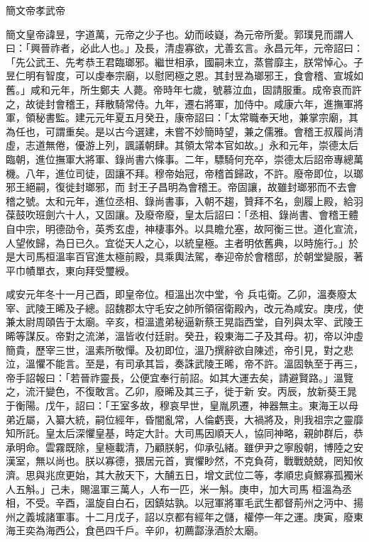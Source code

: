 
\begin{pinyinscope}

 簡文帝孝武帝



 簡文皇帝諱昱，字道萬，元帝之少子也。幼而岐嶷，為元帝所愛。郭璞見而謂人曰：「興晉祚者，必此人也。」及長，清虛寡欲，尤善玄言。永昌元年，元帝詔曰：「先公武王、先考恭王君臨瑯邪。繼世相承，國嗣未立，蒸嘗靡主，朕常悼心。子昱仁明有智度，可以虔奉宗廟，以慰罔極之恩。其封昱為瑯邪王，食會稽、宣城如舊。」咸和元年，所生鄭夫
 人薨。帝時年七歲，號慕泣血，固請服重。成帝哀而許之，故徙封會稽王，拜散騎常侍。九年，遷右將軍，加侍中。咸康六年，進撫軍將軍，領秘書監。建元元年夏五月癸丑，康帝詔曰：「太常職奉天地，兼掌宗廟，其為任也，可謂重矣。是以古今選建，未嘗不妙簡時望，兼之儒雅。會稽王叔履尚清虛，志道無倦，優游上列，諷議朝肆。其領太常本官如故。」永和元年，崇德太后臨朝，進位撫軍大將軍、錄尚書六條事。二年，驃騎何充卒，崇德太后詔帝專總萬機。八年，進位司徒，固讓不拜。穆帝始冠，帝稽首歸政，不許。廢帝即位，以瑯邪王絕嗣，復徙封瑯邪，而
 封王子昌明為會稽王。帝固讓，故雖封瑯邪而不去會稽之號。太和元年，進位丞相、錄尚書事，入朝不趨，贊拜不名，劍履上殿，給羽葆鼓吹班劍六十人，又固讓。及廢帝廢，皇太后詔曰：「丞相、錄尚書、會稽王體自中宗，明德劭令，英秀玄虛，神棲事外。以具瞻允塞，故阿衡三世。道化宣流，人望攸歸，為日已久。宜從天人之心，以統皇極。主者明依舊典，以時施行。」於是大司馬桓溫率百官進太極前殿，具乘輿法駕，奉迎帝於會稽邸，於朝堂變服，著平巾幘單衣，東向拜受璽綬。



 咸安元年冬十一月己酉，即皇帝位。桓溫出次中堂，令
 兵屯衛。乙卯，溫奏廢太宰、武陵王晞及子總。詔魏郡太守毛安之帥所領宿衛殿內，改元為咸安。庚戌，使兼太尉周頤告于太廟。辛亥，桓溫遣弟秘逼新蔡王晃詣西堂，自列與太宰、武陵王晞等謀反。帝對之流涕，溫皆收付廷尉。癸丑，殺東海二子及其母。初，帝以沖虛簡貴，歷宰三世，溫素所敬憚。及初即位，溫乃撰辭欲自陳述，帝引見，對之悲泣，溫懼不能言。至是，有司承其旨，奏誅武陵王晞，帝不許。溫固執至于再三，帝手詔報曰：「若晉祚靈長，公便宜奉行前詔。如其大運去矣，請避賢路。」溫覽之，流汗變色，不復敢言。乙卯，廢晞及其三子，徙于新
 安。丙辰，放新葵王晁于衡陽。戊午，詔曰：「王室多故，穆哀早世，皇胤夙遷，神器無主。東海王以母弟近屬，入纂大統，嗣位經年，昏闇亂常，人倫虧喪，大禍將及，則我祖宗之靈靡知所託。皇太后深懼皇基，時定大計。大司馬因順天人，協同神略，親帥群后，恭承明命。雲霧既除，皇極載清，乃顧朕躬，仰承弘緒。雖伊尹之寧殷朝，博陸之安漢室，無以尚也。朕以寡德，猥居元首，實懼眇然，不克負荷，戰戰兢兢，罔知攸濟。思與兆庶更始，其大赦天下，大酺五日，增文武位二等，孝順忠貞鰥寡孤獨米人五斛。」己未，賜溫軍三萬人，人布一匹，米一斛。庚申，加大司馬
 桓溫為丞相，不受。辛酉，溫旋自白石，因鎮姑孰。以冠軍將軍毛武生都督荊州之沔中、揚州之義城諸軍事。十二月戊子，詔以京都有經年之儲，權停一年之運。庚寅，廢東海王奕為海西公，食邑四千戶。辛卯，初薦酃淥酒於太廟。




\end{pinyinscope}
